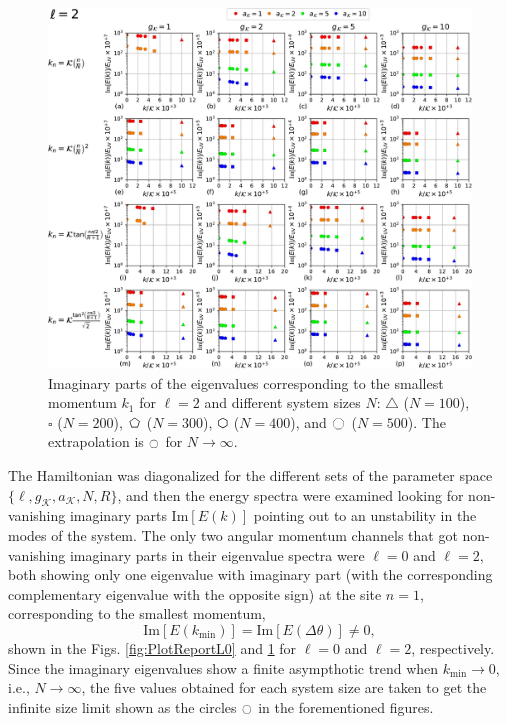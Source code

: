 \documentclass[english,aps,prd,nofootinbib,twocolumn]{revtex4-1}
\newcommand{\largepentagon}{\large{\pentagon}}
\newcommand{\largevarhexagon}{\large{\varhexagon}}
\begin{document}
\begin{figure}
\centering 
\includegraphics[scale=0.5]{./PlotReport/PlotReportL2.pdf}
\caption{Imaginary parts of the eigenvalues corresponding to the smallest momentum $k_{1}$ for $\ell=2$ and different system sizes $N$: $\triangle$ ($N=100$), $\square$ ($N=200$), $\largepentagon$ ($N=300$), $\largevarhexagon$ ($N=400$), and $\octagon$ ($N=500$). The extrapolation is $\ocircle$ for $N\rightarrow \infty$. }
\label{fig:PlotReportL2}
\end{figure}

The Hamiltonian was diagonalized for the different sets of the parameter space $\{\ell, g_{\mathcal{K}}, a_{\mathcal{K}},N,R\}$, and then the energy spectra were examined looking for non-vanishing imaginary parts $\mathrm{Im}[E(k)]$ pointing out to an unstability in the modes of the system. The only two angular momentum channels that got non-vanishing imaginary parts in their eigenvalue spectra were $\ell=0$ and $\ell=2$, both showing only one eigenvalue with imaginary part (with the corresponding complementary eigenvalue with the opposite sign) at the site $n=1$, corresponding to the smallest momentum, 
\begin{equation}
\mathrm{Im}[E(k_{\mathrm{min}})] = \mathrm{Im}\left[E\left(\Delta \theta \right)\right] \neq 0,
\end{equation}
shown in the Figs. \ref{fig:PlotReportL0} and \ref{fig:PlotReportL2} for $\ell=0$ and $\ell=2$, respectively. Since the imaginary eigenvalues show a finite asympthotic trend when $k_{\mathrm{min}}\rightarrow 0$, i.e., $N\rightarrow\infty$, the five values obtained for each system size are taken to get the infinite size limit shown as the circles $\ocircle$ in the forementioned figures. 
\\
\end{document}
